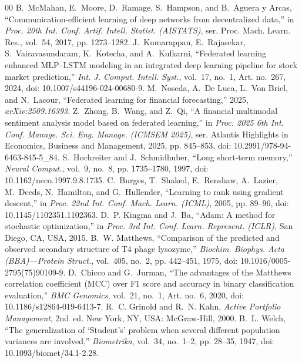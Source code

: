 \documentclass[conference]{IEEEtran}
\begin{document}
\begin{thebibliography}{00}
 B.~McMahan, E.~Moore, D.~Ramage, S.~Hampson, and B.~Aguera y Arcas, ``Communication-efficient learning of deep networks from decentralized data,'' in \emph{Proc. 20th Int. Conf. Artif. Intell. Statist. (AISTATS)}, ser. Proc. Mach. Learn. Res., vol.~54, 2017, pp. 1273--1282.
 J.~Kumarappan, E.~Rajasekar, S.~Vairavasundaram, K.~Kotecha, and A.~Kulkarni, ``Federated learning enhanced MLP--LSTM modeling in an integrated deep learning pipeline for stock market prediction,'' \emph{Int. J. Comput. Intell. Syst.}, vol.~17, no.~1, Art. no.~267, 2024, doi: 10.1007/s44196-024-00680-9.
 M.~Noseda, A.~De Luca, L.~Von Briel, and N.~Lacour, ``Federated learning for financial forecasting,'' 2025, \emph{arXiv:2509.16393}.
 Z.~Zhong, B.~Wang, and Z.~Qi, ``A financial multimodal sentiment analysis model based on federated learning,'' in \emph{Proc. 2025 6th Int. Conf. Manage. Sci. Eng. Manage. (ICMSEM 2025)}, ser. Atlantis Highlights in Economics, Business and Management, 2025, pp. 845--853, doi: 10.2991/978-94-6463-845-5\_84.
 S.~Hochreiter and J.~Schmidhuber, ``Long short-term memory,'' \emph{Neural Comput.}, vol.~9, no.~8, pp. 1735--1780, 1997, doi: 10.1162/neco.1997.9.8.1735.
 C.~Burges, T.~Shaked, E.~Renshaw, A.~Lazier, M.~Deeds, N.~Hamilton, and G.~Hullender, ``Learning to rank using gradient descent,'' in \emph{Proc. 22nd Int. Conf. Mach. Learn. (ICML)}, 2005, pp. 89--96, doi: 10.1145/1102351.1102363.
 D.~P. Kingma and J.~Ba, ``Adam: A method for stochastic optimization,'' in \emph{Proc. 3rd Int. Conf. Learn. Represent. (ICLR)}, San Diego, CA, USA, 2015.
 B.~W. Matthews, ``Comparison of the predicted and observed secondary structure of T4 phage lysozyme,'' \emph{Biochim. Biophys. Acta (BBA)---Protein Struct.}, vol.~405, no.~2, pp. 442--451, 1975, doi: 10.1016/0005-2795(75)90109-9.
 D.~Chicco and G.~Jurman, ``The advantages of the Matthews correlation coefficient (MCC) over F1 score and accuracy in binary classification evaluation,'' \emph{BMC Genomics}, vol.~21, no.~1, Art. no.~6, 2020, doi: 10.1186/s12864-019-6413-7.
 R.~C. Grinold and R.~N. Kahn, \emph{Active Portfolio Management}, 2nd~ed. New York, NY, USA: McGraw-Hill, 2000.
 B.~L. Welch, ``The generalization of `Student's' problem when several different population variances are involved,'' \emph{Biometrika}, vol.~34, no.~1--2, pp. 28--35, 1947, doi: 10.1093/biomet/34.1-2.28.

\end{thebibliography}
\end{document}
